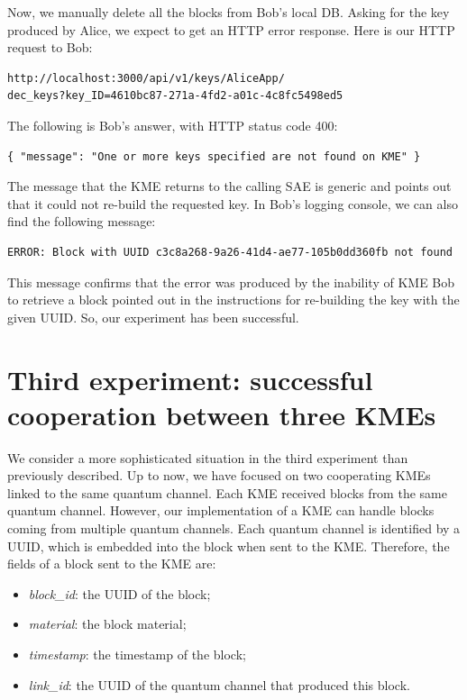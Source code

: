 Now, we manually delete all the blocks from Bob's local DB. Asking for the key produced by Alice, we expect to get an HTTP error response. Here is our HTTP request to Bob:

\begin{verbatim}
http://localhost:3000/api/v1/keys/AliceApp/
dec_keys?key_ID=4610bc87-271a-4fd2-a01c-4c8fc5498ed5
\end{verbatim}

The following is Bob's answer, with HTTP status code 400:

\begin{verbatim}
{ "message": "One or more keys specified are not found on KME" }
\end{verbatim}

The message that the KME returns to the calling SAE is generic and points out that it could not re-build the requested key. In Bob's logging console, we can also find the following message:

\begin{verbatim}
ERROR: Block with UUID c3c8a268-9a26-41d4-ae77-105b0dd360fb not found
\end{verbatim}

This message confirms that the error was produced by the inability of KME Bob to retrieve a block pointed out in the instructions for re-building the key with the given UUID. So, our experiment has been successful.

\label{ch4:exp3}
\section{Third experiment: successful cooperation between three KMEs}
We consider a more sophisticated situation in the third experiment than previously described. Up to now, we have focused on two cooperating KMEs linked to the same quantum channel. Each KME received blocks from the same quantum channel. However, our implementation of a KME can handle blocks coming from multiple quantum channels. Each quantum channel is identified by a UUID, which is embedded into the block when sent to the KME. Therefore, the fields of a block sent to the KME are:

\begin{itemize}
 	\item \textit{block\_id}: the UUID of the block;
	\item \textit{material}: the block material;
	\item \textit{timestamp}: the timestamp of the block;
	\item \textit{link\_id}: the UUID of the quantum channel that produced this block.
\end{itemize}


